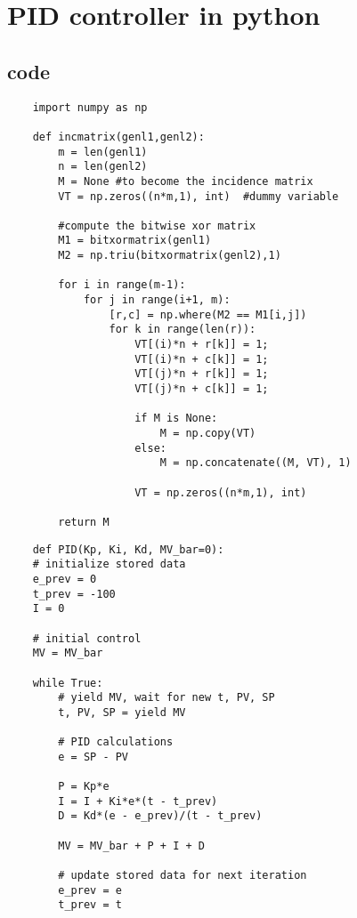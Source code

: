\chapter{\label{method}PID controller in python}



\section{code}

\begin{verbatim}
    import numpy as np
        
    def incmatrix(genl1,genl2):
        m = len(genl1)
        n = len(genl2)
        M = None #to become the incidence matrix
        VT = np.zeros((n*m,1), int)  #dummy variable
        
        #compute the bitwise xor matrix
        M1 = bitxormatrix(genl1)
        M2 = np.triu(bitxormatrix(genl2),1) 
    
        for i in range(m-1):
            for j in range(i+1, m):
                [r,c] = np.where(M2 == M1[i,j])
                for k in range(len(r)):
                    VT[(i)*n + r[k]] = 1;
                    VT[(i)*n + c[k]] = 1;
                    VT[(j)*n + r[k]] = 1;
                    VT[(j)*n + c[k]] = 1;
                    
                    if M is None:
                        M = np.copy(VT)
                    else:
                        M = np.concatenate((M, VT), 1)
                    
                    VT = np.zeros((n*m,1), int)
        
        return M
    \end{verbatim}



\begin{verbatim}
    def PID(Kp, Ki, Kd, MV_bar=0):
    # initialize stored data
    e_prev = 0
    t_prev = -100
    I = 0
    
    # initial control
    MV = MV_bar
    
    while True:
        # yield MV, wait for new t, PV, SP
        t, PV, SP = yield MV
        
        # PID calculations
        e = SP - PV
        
        P = Kp*e
        I = I + Ki*e*(t - t_prev)
        D = Kd*(e - e_prev)/(t - t_prev)
        
        MV = MV_bar + P + I + D
        
        # update stored data for next iteration
        e_prev = e
        t_prev = t

    \end{verbatim}

